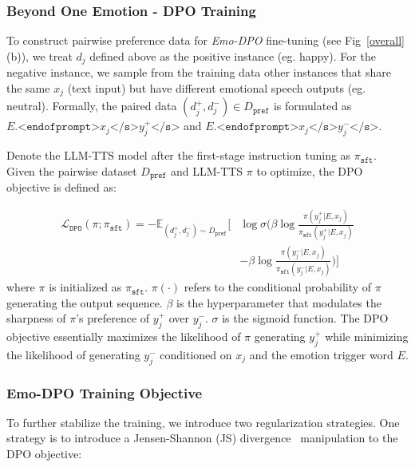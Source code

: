 \documentclass[conference]{IEEEtran}
\begin{document}
\subsubsection{Beyond One Emotion - DPO Training} To construct pairwise preference data for \textit{Emo-DPO} fine-tuning (see Fig~\ref{overall} (b)), we treat $d_j$ defined above as the positive instance (eg. happy). For the negative instance, we sample from the training data other instances that share the same $x_j$ (text input) but have different emotional speech outputs (eg. neutral). Formally, the paired data $(d_j^+, d_j^-) \in D_\texttt{pref}$ is formulated as $E. \texttt{<endofprompt>} x_j \texttt{</s>} y_j^{+} \texttt{</s>}$ and $E. \texttt{<endofprompt>} x_j \texttt{</s>} y_j^{-} \texttt{</s>}$.


Denote the LLM-TTS model after the first-stage instruction tuning as $\pi_{\texttt{sft}}$. Given the pairwise dataset $D_\texttt{pref}$ and LLM-TTS $\pi$ to optimize, the DPO objective is defined as:


\begin{equation*}
\begin{aligned}
  \mathcal{L}_{\texttt{DPO}}(\pi; \pi_{\texttt{sft}}) = -\mathbb{E}_{(d_j^+, d_j^-) \sim D_\texttt{pref}} \Bigg[ 
  & \log \sigma \Big( \beta \log \frac{\pi(y^{+}_j | E, x_j)}{\pi_{\texttt{sft}}(y^{+}_j | E, x_j)} \\ 
  & - \beta \log \frac{\pi(y^{-}_j | E, x_j)}{\pi_{\texttt{sft}}(y^{-}_j | E, x_j)} \Big) \Bigg]
\end{aligned}
\end{equation*}
where $\pi$ is initialized as $\pi_{\texttt{sft}}$. $\pi(\cdot)$ refers to the conditional probability of $\pi$ generating the output sequence. $\beta$ is the hyperparameter that modulates the sharpness of $\pi$'s preference of $y_j^+$ over $y_j^-$. $\sigma$ is the sigmoid function. The DPO objective essentially maximizes the likelihood of $\pi$ generating $y_j^+$ while minimizing the likelihood of generating $y_j^-$ conditioned on $x_j$ and the emotion trigger word $E$. 

\subsubsection{Emo-DPO Training Objective} To further stabilize the training, we introduce two regularization strategies. 
One strategy is to introduce a Jensen-Shannon (JS) divergence~\cite{menendez1997jensen} manipulation to the DPO objective: 
\end{document}
